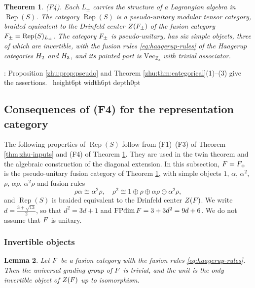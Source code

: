 \documentclass[leqno]{article}
\let\cal\relax
\newcommand{\cal}{\mathcal}
\newcommand{\Z}{\ensuremath{\mathbb{Z}}}
\newcommand{\qed}{\hfill \vrule height6pt  width6pt depth0pt}
\DeclareMathOperator{\Rep}{Rep}
\newtheorem{thm}{Theorem}[section]
\newtheorem{lemma}[thm]{Lemma}
\newenvironment{proof}[1][]{\noindent {\it Proof #1} : }{\hbox{~}\qed
\smallskip
}
\numberwithin{equation}{section}
\begin{document}
\begin{thm}
\label{thm:algebraic-F4}
\textup{(F4)}. Each $L_\pm$ carries the structure of a Lagrangian algebra in $\Rep(S)$. The category $\Rep(S)$ is a pseudo-unitary modular tensor category, braided equivalent to the Drinfeld center $Z(\cal F_\pm)$ of the fusion category $\cal F_\pm = \Rep(S)_{L_\pm}$. The category $\cal F_\pm$ is pseudo-unitary, has six simple objects, three of which are invertible, with the fusion rules \eqref{eq:haagerup-rules} of the Haagerup categories $\cal H_2$ and $\cal H_3$, and its pointed part is $\mathrm{Vec}_{\Z_3}$ with trivial associator.
\end{thm}

\begin{proof}
Proposition \ref{zhu:prop:pseudo} and Theorem \ref{zhu:thm:categorical}(1)--(3) give the assertions.
\end{proof}


\subsection{Consequences of (F4) for the representation category}
\label{sec:category}

The following properties of $\Rep(S)$ follow from (F1)--(F3) of Theorem \ref{thm:zhu-inputs} and (F4) of Theorem \ref{thm:algebraic-F4}. They are used in the twin theorem and the algebraic construction of the diagonal extension. In this subsection, $\cal F = \cal F_+$ is the pseudo-unitary fusion category of Theorem \ref{thm:algebraic-F4}, with simple objects $1$, $\alpha$, $\alpha^2$, $\rho$, $\alpha\rho$, $\alpha^2\rho$ and fusion rules
\begin{equation}
\label{eq:haagerup-rules}
\rho\alpha \cong \alpha^2\rho,
\quad
\rho^2 \cong 1 \oplus \rho \oplus \alpha\rho \oplus \alpha^2\rho,
\end{equation}
and $\Rep(S)$ is braided equivalent to the Drinfeld center $Z(\cal F)$. We write $d = \frac{3+\sqrt{13}}{2}$, so that $d^2 = 3d+1$ and $\operatorname{FPdim}\cal F = 3+3d^2 = 9d+6$. We do not assume that $\cal F$ is unitary.


\subsubsection{Invertible objects}

\begin{lemma}
\label{lem:no-invertible}
Let $\cal F$ be a fusion category with the fusion rules \eqref{eq:haagerup-rules}. Then the universal grading group of $\cal F$ is trivial, and the unit is the only invertible object of $Z(\cal F)$ up to isomorphism.
\end{lemma}
\end{document}

